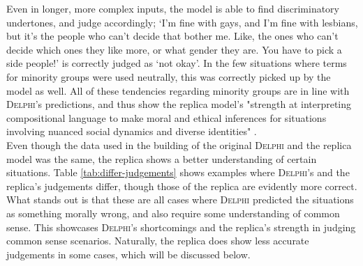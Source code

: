 \documentclass[final]{clv3} %
\begin{document}
Even in longer, more complex inputs, the model is able to find discriminatory undertones, and judge accordingly; ‘I'm fine with gays, and I'm fine with lesbians, but it's the people who can't decide that bother me. Like, the ones who can't decide which ones they like more, or what gender they are. You have to pick a side people!’ is correctly judged as ‘not okay’. In the few situations where terms for minority groups were used neutrally, this was correctly picked up by the model as well.  All of these tendencies regarding minority groups are in line with \textsc{Delphi}’s predictions, and thus show the replica model’s "strength at interpreting compositional language to make moral and ethical inferences for situations involving nuanced social dynamics and diverse identities" \cite[p. 22]{jiang}. \\

Even though the data used in the building of the original \textsc{Delphi} and the replica model was the same, the replica shows a better understanding of certain situations. Table \ref{tab:differ-judgements} shows examples where \textsc{Delphi}’s and the replica’s judgements differ, though those of the replica are evidently more correct. What stands out is that these are all cases where \textsc{Delphi} predicted the situations as something morally wrong, and also require some understanding of common sense. This showcases \textsc{Delphi}’s shortcomings and the replica’s strength in judging common sense scenarios. Naturally, the replica does show less accurate judgements in some cases, which will be discussed below.\\
\end{document}
